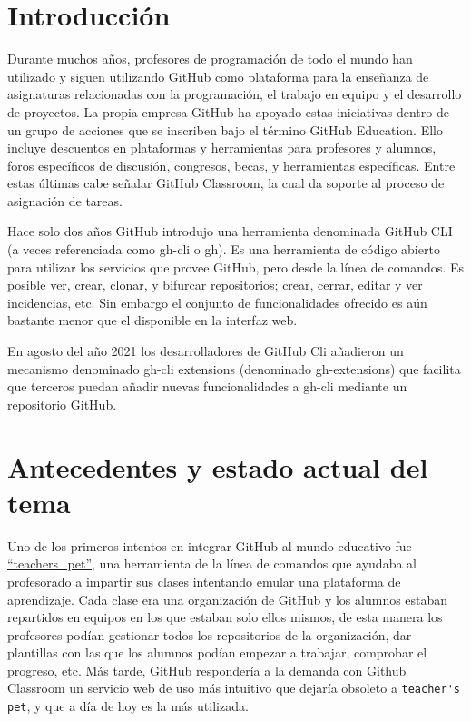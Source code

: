\section{Introducción}
Durante muchos años, profesores de programación de todo el mundo han utilizado y siguen utilizando GitHub como plataforma para la enseñanza de asignaturas relacionadas con la programación, el trabajo en equipo y el desarrollo de proyectos. La propia empresa GitHub ha apoyado estas iniciativas dentro de un grupo de acciones que se inscriben bajo el término  GitHub Education. Ello incluye descuentos en plataformas y herramientas para profesores y alumnos, foros específicos de discusión, congresos, becas, y herramientas específicas. Entre estas últimas cabe señalar  GitHub Classroom, la cual da soporte al proceso de asignación de tareas.

Hace solo dos años GitHub introdujo una herramienta denominada GitHub CLI (a veces referenciada como gh-cli o gh). Es una herramienta de código abierto para utilizar los servicios que provee GitHub, pero desde la línea de comandos.  Es posible ver, crear, clonar, y bifurcar repositorios; crear, cerrar, editar y ver incidencias, etc. Sin embargo el conjunto de funcionalidades  ofrecido es aún bastante menor que el disponible en la interfaz web.

En agosto del año 2021 los desarrolladores de GitHub Cli añadieron un mecanismo denominado gh-cli extensions (denominado gh-extensions) que facilita que terceros puedan añadir nuevas funcionalidades a gh-cli mediante un repositorio GitHub.


\section{Antecedentes y estado actual del tema}
Uno de los primeros intentos en integrar GitHub al mundo educativo fue \href{https://github.com/education/teachers_pet}{“teachers\_pet”}, una herramienta de la línea de comandos que ayudaba al profesorado a impartir sus clases intentando emular una plataforma de aprendizaje. Cada clase era una organización de GitHub y los alumnos estaban repartidos en equipos en los que estaban solo ellos mismos, de esta manera los profesores podían gestionar todos los repositorios de la organización, dar plantillas con las que los alumnos podían empezar a trabajar, comprobar el progreso, etc.
 Más tarde, GitHub respondería a la demanda con Github Classroom  un servicio web de uso más intuitivo que dejaría obsoleto a \verb|teacher's pet|, y que a día de hoy es la más utilizada.


